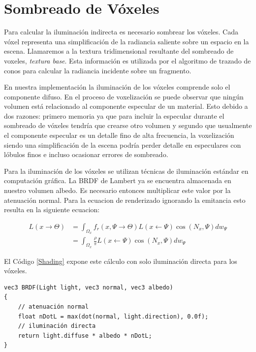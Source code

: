 \section{Sombreado de Vóxeles} %
\label{sec:sombreado_de_voxeles_impl}
Para calcular la iluminación indirecta es necesario sombrear los vóxeles. Cada vóxel representa una simplificación de la radiancia saliente sobre un espacio en la escena. Llamaremos a la textura tridimensional resultante del sombreado de voxeles, \emph{textura base}. Esta información es utilizada por el algoritmo de trazado de conos para calcular la radiancia incidente sobre un fragmento.

En nuestra implementación la iluminación de los vóxeles comprende solo el componente difuso. En el proceso de voxelización se puede observar que ningún volumen está relacionado al componente especular de un material. Esto debido a dos razones: primero memoria ya que para incluir la especular durante el sombreado de vóxeles tendría que crearse otro volumen y segundo que usualmente el componente especular es un detalle fino de alta frecuencia, la voxelización siendo una simplificación de la escena podría perder detalle en especulares con lóbulos finos e incluso ocasionar errores de sombreado.

Para la iluminación de los vóxeles se utilizan técnicas de iluminación estándar en computación gráfica. La \ac{BRDF} de Lambert ya se encuentra almacenada en nuestro volumen albedo. Es necesario entonces multiplicar este valor por la atenuación normal. Para la ecuacion de renderizado ignorando la emitancia esto resulta en la siguiente ecuacion:

\begin{equation}
	\begin{split}
		L(x\to\Theta) &= \int_{\Omega_{x}}{f_{r}(x, \Psi\to\Theta)L(x\gets\Psi)\cos(N_{x}, \Psi)dw_{\Psi}}\\
		&= \int_{\Omega_{x}}{\frac{\rho}{\pi}L(x\gets\Psi)\cos(N_{x}, \Psi)dw_{\Psi}}
	\end{split}
	\label{eq:shading_voxels}
\end{equation}

El Código \ref{Shading} expone este cálculo con solo iluminación directa para los vóxeles.
\\
\begin{lstlisting}[caption={Sombreado estándar para un vóxel}, label=Shading]
vec3 BRDF(Light light, vec3 normal, vec3 albedo)
{
	// atenuación normal
	float nDotL = max(dot(normal, light.direction), 0.0f);
	// iluminación directa
	return light.diffuse * albedo * nDotL;
}
\end{lstlisting}

